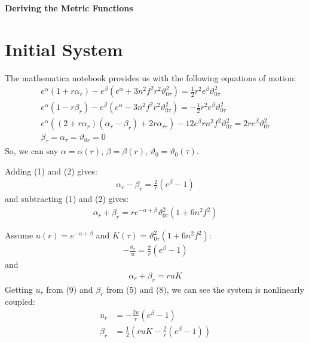 \documentclass[12pt]{article}
\begin{document}
\begin{center}
  \Large\textbf{Deriving the Metric Functions} \\
  \large{}
\end{center}

\section*{Initial System}

The mathematica notebook provides us with the following equations of motion:
\begin{align}
  e^\alpha(1+r\alpha_r) - e^\beta(e^\alpha+3n^2f^2r^2\vartheta_{0\tau}^2) = \frac{1}{2}r^2e^\beta\vartheta_{0\tau}^2 \\
  e^\alpha(1-r\beta_r) - e^\beta(e^\alpha-3n^2f^2r^2\vartheta_{0\tau}^2) = -\frac{1}{2}r^2e^\beta\vartheta_{0\tau}^2 \\
  e^\alpha\left((2+r\alpha_r)(\alpha_r-\beta_r)+2r\alpha_{rr}\right) - 12e^\beta rn^2f^2\vartheta_{0\tau}^2=2re^\beta \vartheta_{0\tau}^2 \\
  \beta_\tau = \alpha_\tau = \vartheta_{0r} = 0
\end{align}
So, we can say $\alpha = \alpha(r)$, $\beta = \beta(r)$, $\vartheta_0 = \vartheta_0(\tau)$.

Adding (1) and (2) gives:
\begin{align}
  \alpha_r - \beta_r = \frac{2}{r}(e^\beta - 1)
\end{align}
and subtracting (1) and (2) gives:
\begin{align}
  \alpha_r + \beta_r = re^{-\alpha+\beta}\vartheta_{0\tau}^2(1+6n^2f^2)
\end{align}

Assume $u(r) = e^{-\alpha+\beta}$ and $K(\tau) = \vartheta_{0\tau}^2(1+6n^2f^2)$:
\begin{align}
  -\frac{u_r}{u} = \frac{2}{r}(e^\beta-1)
\end{align}
and
\begin{align}
  \alpha_r + \beta_r = ruK
\end{align}
Getting $u_r$ from (9) and $\beta_r$ from (5) and (8), we can see the system is nonlinearly coupled:
\begin{align}
  u_r &= -\frac{2u}{r}(e^\beta-1) \\
  \beta_r &= \frac{1}{2}\left(ruK-\frac{2}{r}(e^{\beta}-1)\right)
\end{align}
\end{document}
